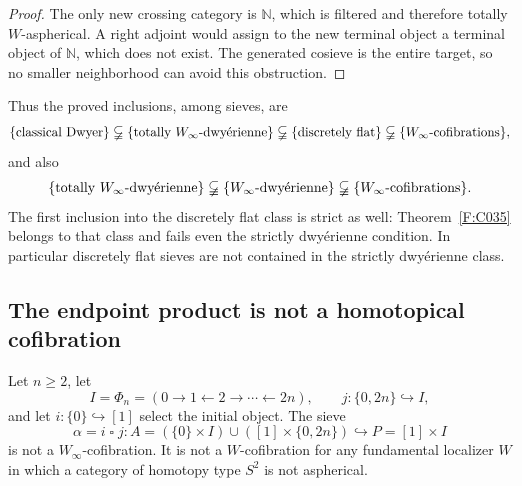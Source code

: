 \begin{proof}
The only new crossing category is $\mathbb N$, which is
filtered and therefore totally $W$-aspherical. A right adjoint
would assign to the new terminal object a terminal object of
$\mathbb N$, which does not exist. The generated cosieve is
the entire target, so no smaller neighborhood can avoid this
obstruction.
\end{proof}

Thus the proved inclusions, among sieves, are
\[
 \{\text{classical Dwyer}\}
 \varsubsetneqq
 \{\text{totally }W_\infty\text{-dwy\'erienne}\}
 \varsubsetneqq
 \{\text{discretely flat}\}
 \varsubsetneqq
 \{W_\infty\text{-cofibrations}\},
\]
and also
\[
 \{\text{totally }W_\infty\text{-dwy\'erienne}\}
 \varsubsetneqq
 \{W_\infty\text{-dwy\'erienne}\}
 \varsubsetneqq
 \{W_\infty\text{-cofibrations}\}.
\]
The first inclusion into the discretely flat class is strict as
well: Theorem~\ref{F:C035} belongs to that class and fails even
the strictly dwy\'erienne condition. In particular discretely
flat sieves are not contained in the strictly dwy\'erienne
class.

\subsection{The endpoint product is not a homotopical cofibration}

\begin{theorem}\label{F:interval-failure}
Let $n\geq2$, let
\[
 I=\Phi_n=(0\to1\leftarrow2\to\cdots\leftarrow2n),
 \qquad j:\{0,2n\}\hookrightarrow I,
\]
and let $i:\{0\}\hookrightarrow[1]$ select the initial object.
The sieve
\[
 \alpha=i\mathbin{\square}j:
 A=(\{0\}\times I)\cup([1]\times\{0,2n\})
       \hookrightarrow P=[1]\times I
\]
is not a $W_\infty$-cofibration. It is not a $W$-cofibration
for any fundamental localizer $W$ in which a category of
homotopy type $S^2$ is not aspherical.
\end{theorem}

